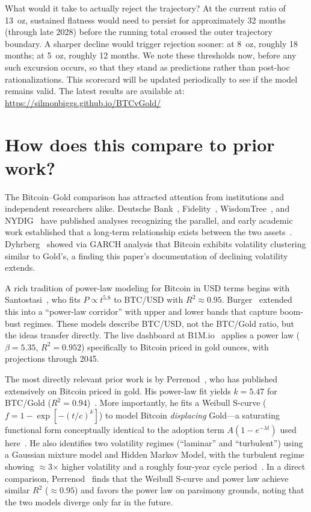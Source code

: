 \documentclass[11pt,letterpaper]{article}
\begin{document}
What would it take to actually reject the trajectory? At the current ratio of 13~oz, sustained flatness would need to persist for approximately 32 months (through late 2028) before the running total crossed the outer trajectory boundary. A sharper decline would trigger rejection sooner: at 8~oz, roughly 18 months; at 5~oz, roughly 12 months. We note these thresholds now, before any such excursion occurs, so that they stand as predictions rather than post-hoc rationalizations. This scorecard will be updated periodically to see if the model remains valid. The latest results are available at: \url{https://silmonbiggs.github.io/BTCvGold/}

\section{How does this compare to prior work?}

The Bitcoin--Gold comparison has attracted attention from institutions and independent researchers alike. Deutsche Bank~\cite{deutschebank2025}, Fidelity~\cite{fidelity2024}, WisdomTree~\cite{wisdomtree2025}, and NYDIG~\cite{cipolaro2025} have published analyses recognizing the parallel, and early academic work established that a long-term relationship exists between the two assets~\cite{zwick2019}. Dyhrberg~\cite{dyhrberg2016} showed via GARCH analysis that Bitcoin exhibits volatility clustering similar to Gold's, a finding this paper's documentation of declining volatility extends.

A rich tradition of power-law modeling for Bitcoin in USD terms begins with Santostasi~\cite{santostasi2024}, who fits $P \propto t^{5.8}$ to BTC/USD with $R^2 \approx 0.95$. Burger~\cite{burger2019} extended this into a ``power-law corridor'' with upper and lower bands that capture boom-bust regimes. These models describe BTC/USD, not the BTC/Gold ratio, but the ideas transfer directly. The live dashboard at B1M.io~\cite{b1m2026} applies a power law ($\beta = 5.35$, $R^2 = 0.952$) specifically to Bitcoin priced in gold ounces, with projections through 2045.

The most directly relevant prior work is by Perrenod~\cite{perrenod2021,perrenod2024a,perrenod2025}, who has published extensively on Bitcoin priced in gold. His power-law fit yields $k = 5.47$ for BTC/Gold ($R^2 = 0.94$)~\cite{perrenod2024a}. More importantly, he fits a Weibull S-curve ($f = 1 - \exp[-(t/c)^k]$) to model Bitcoin \emph{displacing} Gold---a saturating functional form conceptually identical to the adoption term $A(1 - e^{-\lambda t})$ used here~\cite{perrenod2021}. He also identifies two volatility regimes (``laminar'' and ``turbulent'') using a Gaussian mixture model and Hidden Markov Model, with the turbulent regime showing $\approx$3$\times$ higher volatility and a roughly four-year cycle period~\cite{perrenod2025}. In a direct comparison, Perrenod~\cite{perrenod2024b} finds that the Weibull S-curve and power law achieve similar $R^2$ ($\approx 0.95$) and favors the power law on parsimony grounds, noting that the two models diverge only far in the future.
\end{document}
